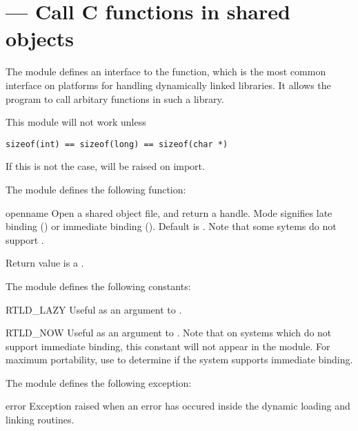 \section{ ---
         Call C functions in shared objects}

The  module defines an interface to the
 function, which is the most common interface on
\UNIX{} platforms for handling dynamically linked libraries. It allows
the program to call arbitary functions in such a library.

 This module will not work unless
\begin{verbatim}
sizeof(int) == sizeof(long) == sizeof(char *)
\end{verbatim}
If this is not the case,  will be raised on
import.

The  module defines the following function:

\begin{funcdesc}{open}{name}
Open a shared object file, and return a handle. Mode
signifies late binding () or immediate binding
(). Default is . Note that some
sytems do not support .

Return value is a .
\end{funcdesc}

The  module defines the following constants:

\begin{datadesc}{RTLD_LAZY}
Useful as an argument to .
\end{datadesc}

\begin{datadesc}{RTLD_NOW}
Useful as an argument to .  Note that on systems
which do not support immediate binding, this constant will not appear
in the module. For maximum portability, use  to
determine if the system supports immediate binding.
\end{datadesc}

The  module defines the following exception:

\begin{excdesc}{error}
Exception raised when an error has occured inside the dynamic loading
and linking routines.
\end{excdesc}

